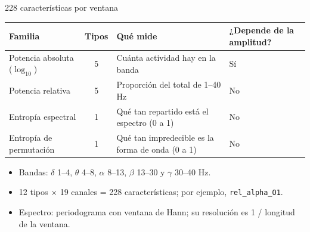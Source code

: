 \documentclass[aspectratio=169,11pt]{beamer}
\begin{document}
\begin{frame}{228 características por ventana}
  \footnotesize
  \centering
  \begin{tabular}{@{}P{3.9cm} c P{5.4cm} >{\centering\arraybackslash}p{2.3cm}@{}}
    \toprule
    Familia & Tipos & Qué mide & ¿Depende de la amplitud? \\
    \midrule
    Potencia absoluta ($\log_{10}$) & 5 & Cuánta actividad hay en la banda & Sí \\
    Potencia relativa & 5 & Proporción del total de 1--40 Hz & No \\
    Entropía espectral & 1 & Qué tan repartido está el espectro (0 a 1) & No \\
    Entropía de permutación & 1 & Qué tan impredecible es la forma de onda (0 a 1) & No \\
    \bottomrule
  \end{tabular}

  \vspace{4mm}
  \raggedright
  \begin{itemize}\small
    \item Bandas: $\delta$ 1--4, $\theta$ 4--8, $\alpha$ 8--13, $\beta$ 13--30 y $\gamma$ 30--40 Hz.
    \item 12 tipos × 19 canales = \alert{228 características}; por ejemplo, \texttt{rel\_alpha\_O1}.
    \item Espectro: periodograma con ventana de Hann; su resolución es 1 / longitud de la ventana.
  \end{itemize}
\end{frame}
\end{document}
